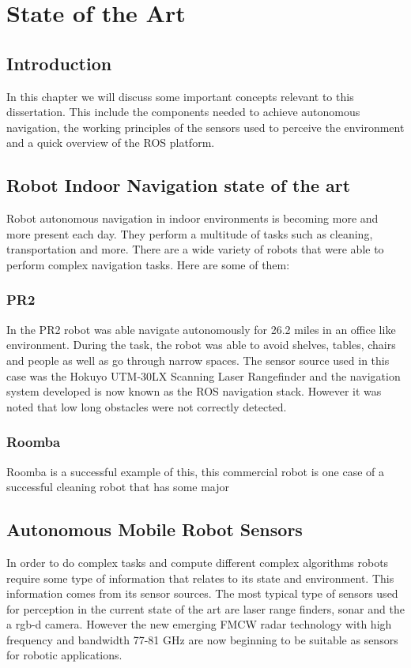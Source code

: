 \chapter{State of the Art} \label{ch:Concepts}

\section{Introduction}
In this chapter we will discuss some important concepts relevant to this dissertation. This include the components needed to achieve autonomous navigation, the working principles of the sensors used to perceive the environment and a quick overview of the \ac{ROS} platform.
\section{Robot Indoor Navigation state of the art}
Robot autonomous navigation in indoor environments is becoming more and more present each day. They perform a multitude of tasks such as cleaning, transportation and more. There are a wide variety of robots that were able to perform complex navigation tasks. Here are some of them:
\subsection{PR2}
In  \cite{marder2010office}  the PR2 robot was able navigate autonomously for 26.2 miles in an office like environment. During the task, the robot was able to avoid  shelves, tables, chairs and people as well as go
through narrow spaces. The sensor source used in this case was the Hokuyo UTM-30LX Scanning Laser Rangefinder and the navigation system developed is now known as the \ac{ROS} navigation stack. However it was noted that low long obstacles were not correctly detected.

\subsection{Roomba}
Roomba is a successful  example of this, this   commercial robot is one case of a successful cleaning robot that has some major 

\section{Autonomous Mobile Robot Sensors}

In order to do complex tasks and compute different complex algorithms robots require some type of information that relates to its state and environment. This information comes from its sensor sources.
The most typical type of sensors used for perception in the current state of the art are laser range finders, sonar and the a rgb-d camera. However the new emerging \ac{FMCW} radar technology with high frequency and bandwidth 77-81 GHz are now beginning to be suitable as sensors for robotic applications.

